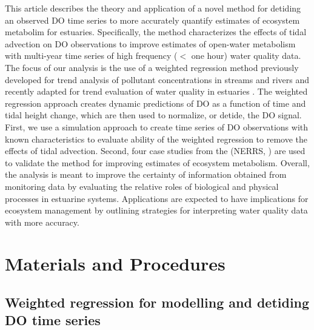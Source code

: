 \documentclass[letterpaper,12pt,oneside]{article}\usepackage[]{graphicx}\usepackage[]{color}
\begin{document}
This article describes the theory and application of a novel method for detiding an observed \ac{DO} time series to more accurately quantify estimates of ecosystem metabolim for estuaries.  Specifically, the method characterizes the effects of tidal advection on \ac{DO} observations to improve estimates of open-water metabolism with multi-year time series of high frequency ($<$ one hour) water quality data.  The focus of our analysis is the use of a weighted regression method previously developed for trend analysis of pollutant concentrations in streams and rivers \citep{Hirsch10} and recently adapted for trend evaluation of water quality in estuaries .  The weighted regression approach creates dynamic predictions of \ac{DO} as a function of time and tidal height change, which are then used to normalize, or detide, the \ac{DO} signal.  First, we use a simulation approach to create time series of \ac{DO} observations with known characteristics to evaluate ability of the weighted regression to remove the effects of tidal advection.  Second, four case studies from the  (\acs{NERRS}, \citealt{Wenner04}) are used to validate the method for improving estimates of ecosystem metabolism.  Overall, the analysis is meant to improve the certainty of information obtained from monitoring data by evaluating the relative roles of biological and physical processes in estuarine systems.  Applications are expected to have implications for ecosystem management by outlining strategies for interpreting water quality data with more accuracy.

\section{Materials and Procedures}

\subsection{Weighted regression for modelling and detiding \ac{DO} time series}
\end{document}
